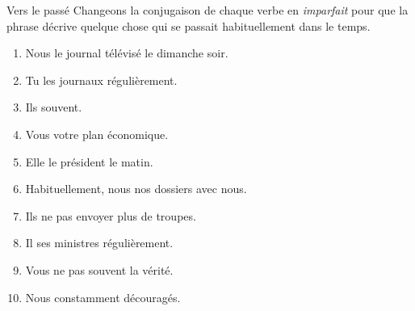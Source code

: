 \begin{frame}{Vers le passé}
  Changeons la conjugaison de chaque verbe en \emph{imparfait} pour que la phrase décrive quelque chose qui se passait habituellement dans le temps.
  \begin{enumerate}
    \item Nous  le journal télévisé le dimanche soir.
    \item Tu  les journaux régulièrement.
    \item Ils  souvent.
    \item Vous  votre plan économique.
    \item Elle  le président le matin.
    \item Habituellement, nous  nos dossiers avec nous.
    \item Ils ne  pas envoyer plus de troupes.
    \item Il  ses ministres régulièrement.
    \item Vous ne  pas souvent la vérité.
    \item Nous  constamment découragés.
  \end{enumerate}
\end{frame}